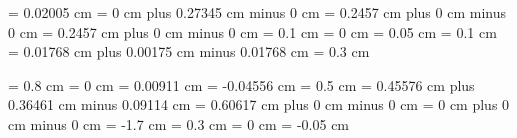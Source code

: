 \gre@maximumspacewithoutdash = 0.02005 cm
\gre@afterclefnospace = 0 cm plus 0.27345 cm minus 0 cm
\gre@afterinitialshift = 0.2457 cm plus 0 cm minus 0 cm
\gre@beforeinitialshift = 0.2457 cm plus 0 cm minus 0 cm
\gre@minimalspaceatlinebeginning = 0.1 cm
\gre@manualinitialwidth = 0 cm
\gre@aboveinitialseparation = 0.05 cm
\gre@noclefspace = 0.1 cm
\gre@clefchangespace = 0.01768 cm plus 0.00175 cm minus 0.01768 cm%
\gre@clivisalignmentmin = 0.3 cm




\gre@abovesignsspace = 0.8 cm
\gre@belowsignsspace = 0 cm
\gre@lowchoralsignshift = 0.00911 cm
\gre@highchoralsignshift = -0.04556 cm
\gre@translationheight = 0.5 cm
\gre@spaceabovelines = 0.45576 cm plus 0.36461 cm minus 0.09114 cm
\gre@spacelinestext = 0.60617 cm plus 0 cm minus 0 cm
\gre@spacebeneathtext = 0 cm plus 0 cm minus 0 cm
\gre@abovelinestextraise = -1.7 cm%
\gre@abovelinestextheight = 0.3 cm%
\gre@braceshift = 0 cm
\gre@curlybraceaccentusshift = -0.05 cm

\makeatother